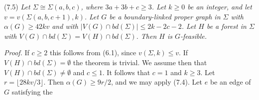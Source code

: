 \stmt
(7.5) \textit{Let $\Sigma \cong \Sigma(a, b, c)$, where $3a + 3b + c \ge 3$. Let $k \ge 0$ be an integer, and let $v = v(\Sigma(a, b, c+1), k)$. Let $G$ be a boundary-linked proper graph in $\Sigma$ with $\alpha(G) \ge 42kv$ and with $|V(G) \cap bd(\Sigma)| \le 2k - 2c - 2$. Let $H$ be a forest in $\Sigma$ with $V(G) \cap bd(\Sigma) = V(H) \cap bd(\Sigma)$. Then $H$ is $G$-feasible.}

\textit{Proof.} If $c \ge 2$ this follows from (6.1), since $v(\Sigma, k) \le v$. If $V(H) \cap bd(\Sigma) = \emptyset$ the theorem is trivial. We assume then that $V(H) \cap bd(\Sigma) \ne \emptyset$ and $c \le 1$. It follows that $c = 1$ and $k \ge 3$. Let $r = \lfloor 28kv/3 \rfloor$. Then $\alpha(G) \ge 9r/2$, and we may apply (7.4). Let $e$ be an edge of $G$ satisfying the
